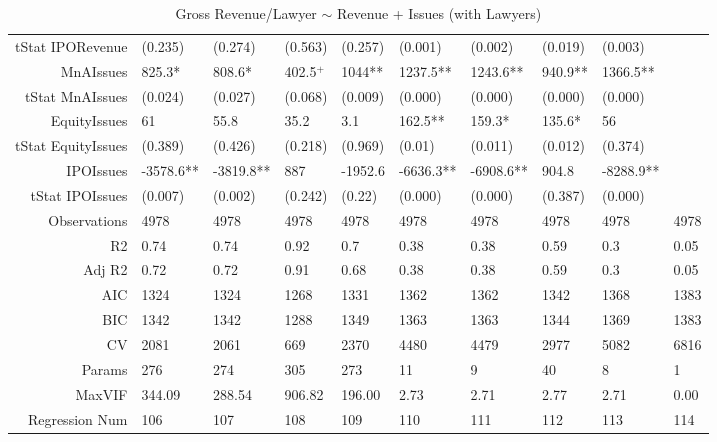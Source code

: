 \begin{table}[ht]
\begin{tabular}{rlllllllll}
  tStat IPORevenue & (0.235) & (0.274) & (0.563) & (0.257) & (0.001) & (0.002) & (0.019) & (0.003) &  \\ 
  MnAIssues & 825.3* & 808.6* & 402.5$^{+}$ & 1044** & 1237.5** & 1243.6** & 940.9** & 1366.5** &  \\ 
  tStat MnAIssues & (0.024) & (0.027) & (0.068) & (0.009) & (0.000) & (0.000) & (0.000) & (0.000) &  \\ 
  EquityIssues & 61 & 55.8 & 35.2 & 3.1 & 162.5** & 159.3* & 135.6* & 56 &  \\ 
  tStat EquityIssues & (0.389) & (0.426) & (0.218) & (0.969) & (0.01) & (0.011) & (0.012) & (0.374) &  \\ 
  IPOIssues & -3578.6** & -3819.8** & 887 & -1952.6 & -6636.3** & -6908.6** & 904.8 & -8288.9** &  \\ 
  tStat IPOIssues & (0.007) & (0.002) & (0.242) & (0.22) & (0.000) & (0.000) & (0.387) & (0.000) &  \\ 
  Observations & 4978 & 4978 & 4978 & 4978 & 4978 & 4978 & 4978 & 4978 & 4978 \\ 
  R2 & 0.74 & 0.74 & 0.92 & 0.7 & 0.38 & 0.38 & 0.59 & 0.3 & 0.05 \\ 
  Adj R2 & 0.72 & 0.72 & 0.91 & 0.68 & 0.38 & 0.38 & 0.59 & 0.3 & 0.05 \\ 
  AIC & 1324 & 1324 & 1268 & 1331 & 1362 & 1362 & 1342 & 1368 & 1383 \\ 
  BIC & 1342 & 1342 & 1288 & 1349 & 1363 & 1363 & 1344 & 1369 & 1383 \\ 
  CV & 2081 & 2061 & 669 & 2370 & 4480 & 4479 & 2977 & 5082 & 6816 \\ 
  Params & 276 & 274 & 305 & 273 & 11 & 9 & 40 & 8 & 1 \\ 
  MaxVIF & 344.09 & 288.54 & 906.82 & 196.00 & 2.73 & 2.71 & 2.77 & 2.71 & 0.00 \\ 
  Regression Num & 106 & 107 & 108 & 109 & 110 & 111 & 112 & 113 & 114 \\ 
   \hline
\end{tabular}
\caption{Gross Revenue/Lawyer $\sim$ Revenue + Issues (with Lawyers)} 
\end{table}

